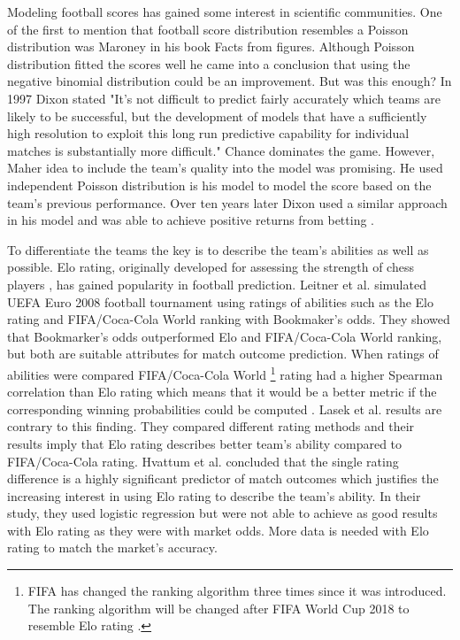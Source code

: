 Modeling football scores has gained some interest in scientific communities. One of the first to mention that football score distribution resembles a Poisson distribution was Maroney \cite{moroney1962facts} in his book Facts from figures. Although Poisson distribution fitted the scores well he came into a conclusion that using the negative binomial distribution could be an improvement. But was this enough? In 1997 Dixon stated \cite{dixon1997} "It's not difficult to predict fairly accurately which teams are likely to be successful, but the development of models that have a sufficiently high resolution to exploit this long run predictive capability for individual matches is substantially more difficult." Chance dominates the game. However, Maher \cite{maher1982modelling} idea to include the team's quality into the model was promising. He used independent Poisson distribution is his model to model the score based on the team's previous performance. Over ten years later Dixon used a similar approach in his model and was able to achieve positive returns from betting \cite{dixon1997}.

To differentiate the teams the key is to describe the team's abilities as well as possible. Elo rating, originally developed for assessing the strength of chess players \cite{elo1978rating}, has gained popularity in football prediction. Leitner et al. \cite{leitner2010forecasting} simulated UEFA Euro 2008 football tournament using ratings of abilities such as the Elo rating and FIFA/Coca-Cola World ranking with Bookmaker's odds. They showed that Bookmarker's odds outperformed Elo and FIFA/Coca-Cola World ranking, but both are suitable attributes for match outcome prediction. When ratings of abilities were compared FIFA/Coca-Cola World \footnote{FIFA has changed the ranking algorithm three times since it was introduced. The ranking algorithm will be changed after FIFA World Cup 2018 to resemble Elo rating \cite{wiki:fifarating}.} rating had a higher Spearman correlation than Elo rating which means that it would be a better metric if the corresponding winning probabilities could be computed \cite{leitner2010forecasting}. Lasek et al. \cite{lasek2013predictive} results are contrary to this finding. They compared different rating methods and their results imply that Elo rating describes better team's ability compared to FIFA/Coca-Cola rating. Hvattum et al. \cite{hvattum2010using} concluded that the single rating difference is a highly significant predictor of match outcomes which justifies the increasing interest in using Elo rating to describe the team's ability. In their study, they used logistic regression but were not able to achieve as good results with Elo rating as they were with market odds. More data is needed with Elo rating to match the market's accuracy.

